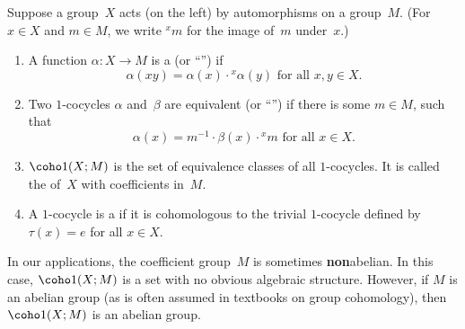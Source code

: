 \begin{defns}
Suppose a group~$X$ acts (on the left) by automorphisms on a group~$M$. (For $x \in X$ and $m \in M$, we write ${}^x m$ for the image of~$m$ under~$x$.)
	\begin{enumerate}
	\item A function $\alpha \colon X \to M$ is a  (or ``'') if 
		$$ \text{$\alpha(xy) = \alpha(x) \cdot {}^x \! \alpha(y)$ for all $x,y \in X$} .$$
	\item Two $1$-cocycles $\alpha$ and~$\beta$ are equivalent (or ``'') if there is some $m \in M$, such that 
		$$ \text{$\alpha(x) = m^{-1} \cdot \beta(x) \cdot {}^x m$ \ for all $x \in X$} .$$
	\item {}%
	$\coho1(X;M)$ is the set  of equivalence classes of all $1$-cocycles. It is called the  of~$X$ with coefficients in~$M$.
	\item A $1$-cocycle is a  if it is cohomologous to the trivial $1$-cocycle defined by $\tau(x) = e$ for all $x \in X$.
	\end{enumerate}
\end{defns}

\begin{warn}
In our applications, the coefficient group~$M$ is sometimes \textbf{non}abelian. In this case, $\coho1(X;M)$ is a set with no obvious algebraic structure. However, if $M$ is an abelian group (as is often assumed in textbooks on group cohomology), then $\coho1(X;M)$ is an abelian group. 
\end{warn}

